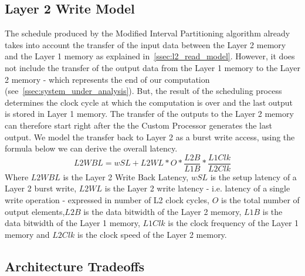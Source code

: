 \subsection{Layer 2 Write Model}
The schedule produced by the Modified Interval Partitioning algorithm already takes into account the transfer of the input data between the Layer 2 memory and the Layer 1 memory as explained in~\ref{ssec:l2_read_model}. However, it does not include the transfer of the output data from the Layer 1 memory to the Layer 2 memory - which represents the end of our computation (see~\ref{ssec:system_under_analysis}). But, the result of the scheduling process determines the clock cycle at which the computation is over and the last output is stored in Layer 1 memory. The transfer of the outputs to the Layer 2 memory can therefore start right after the the Custom Processor generates the last output. We model the transfer back to Layer 2 as a burst write access, using the formula below we can derive the overall latency.
$$
L2WBL = wSL + L2WL * O * \frac{L2B}{L1B} * \frac{L1Clk}{L2Clk}
$$
Where $L2WBL$ is the Layer 2 Write Back Latency, $wSL$ is the setup latency of a Layer 2 burst write, $L2WL$ is the Layer 2 write latency - i.e. latency of a single write operation - expressed in number of L2 clock cycles, $O$ is the total number of output elements,$L2B$ is the data bitwidth of the Layer 2 memory, $L1B$ is the data bitwidth of the Layer 1 memory, $L1Clk$ is the clock frequency of the Layer 1 memory and $L2Clk$ is the clock speed of the Layer 2 memory.

\subsection{Architecture Tradeoffs}

